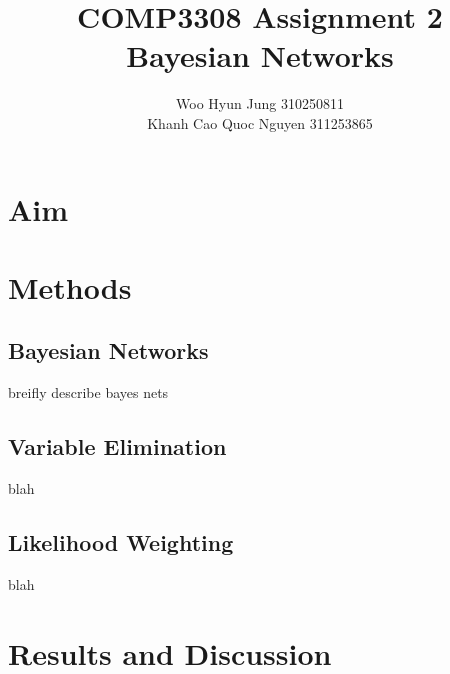 \documentclass{article}
\title{COMP3308 Assignment 2 \\ Bayesian Networks}
\author{Woo Hyun Jung 310250811 \\  Khanh Cao Quoc Nguyen 311253865}
\date{}
\begin{document}
\maketitle
\thispagestyle{empty}
\newpage

\section{Aim}


\section{Methods}
\subsection{Bayesian Networks}
breifly describe bayes nets

\subsection{Variable Elimination}
blah

\subsection{Likelihood Weighting}
blah

\section{Results and Discussion}
\end{document}
